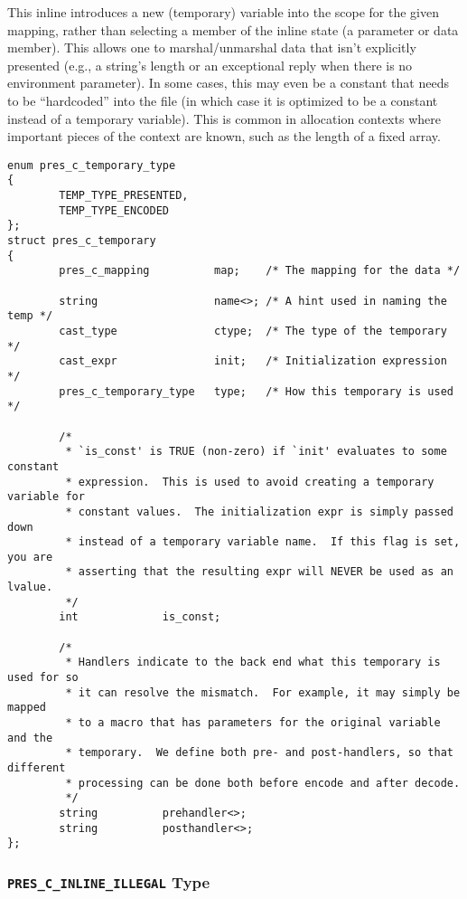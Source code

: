 This inline introduces a new (temporary) variable into the scope for the given
mapping, rather than selecting a member of the inline state (a parameter or
data member).  This allows one to marshal/unmarshal data that isn't explicitly
presented (e.g., a string's length or an exceptional reply when there is no
environment parameter).  In some cases, this may even be a constant that needs
to be ``hardcoded'' into the \PRESC{} file (in which case it is optimized to be
a constant instead of a temporary variable).  This is common in allocation
contexts where important pieces of the context are known, such as the length of
a fixed array.

\begin{verbatim}
enum pres_c_temporary_type
{
        TEMP_TYPE_PRESENTED,
        TEMP_TYPE_ENCODED
};
struct pres_c_temporary
{
        pres_c_mapping          map;    /* The mapping for the data */
        
        string                  name<>; /* A hint used in naming the temp */
        cast_type               ctype;  /* The type of the temporary */
        cast_expr               init;   /* Initialization expression */
        pres_c_temporary_type   type;   /* How this temporary is used */
        
        /*
         * `is_const' is TRUE (non-zero) if `init' evaluates to some constant
         * expression.  This is used to avoid creating a temporary variable for
         * constant values.  The initialization expr is simply passed down
         * instead of a temporary variable name.  If this flag is set, you are
         * asserting that the resulting expr will NEVER be used as an lvalue.
         */
        int             is_const;
        
        /*
         * Handlers indicate to the back end what this temporary is used for so
         * it can resolve the mismatch.  For example, it may simply be mapped
         * to a macro that has parameters for the original variable and the
         * temporary.  We define both pre- and post-handlers, so that different
         * processing can be done both before encode and after decode.
         */
        string          prehandler<>;   
        string          posthandler<>;  
};
\end{verbatim}

\subsubsection{\texttt{PRES\_C\_INLINE\_ILLEGAL} Type}

